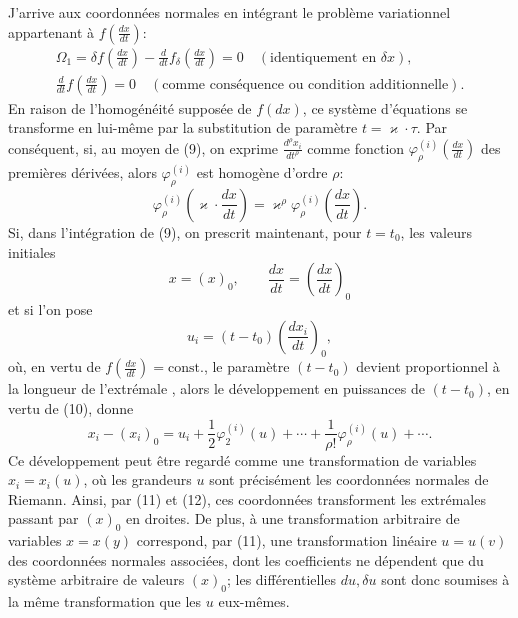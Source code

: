 J'arrive aux coordonnées normales en intégrant le problème variationnel
appartenant à \(f\!\left(\frac{dx}{dt}\right)\):
\begin{equation}
\begin{gathered}
\Omega_1=\delta f\!\left(\frac{dx}{dt}\right)
-\frac{d}{dt}f_\delta\!\left(\frac{dx}{dt}\right)=0
\quad(\text{identiquement en }\delta x),\\
\frac{d}{dt}f\!\left(\frac{dx}{dt}\right)=0
\quad(\text{comme conséquence ou condition additionnelle}).
\end{gathered}
\tag{9}
\end{equation}
En raison de l'homogénéité supposée de \(f(dx)\), ce système d'équations
se transforme en lui-même par la substitution de paramètre
\(t=\varkappa\cdot\tau\). Par conséquent, si, au moyen de (9), on exprime
\(\frac{d^\rho x_i}{dt^\rho}\) comme fonction
\(\varphi_\rho^{(i)}\!\left(\frac{dx}{dt}\right)\) des premières dérivées,
alors \(\varphi_\rho^{(i)}\) est homogène d'ordre \(\rho\):
\begin{equation}
\varphi_\rho^{(i)}\!\left(\varkappa\cdot\frac{dx}{dt}\right)
=\varkappa^\rho\varphi_\rho^{(i)}\!\left(\frac{dx}{dt}\right).
\tag{10}
\end{equation}
Si, dans l'intégration de (9), on prescrit maintenant, pour \(t=t_0\),
les valeurs initiales
\[
x=(x)_0,\qquad \frac{dx}{dt}=\left(\frac{dx}{dt}\right)_0
\]
et si l'on pose
\begin{equation}
u_i=(t-t_0)\left(\frac{dx_i}{dt}\right)_0,
\tag{11}
\end{equation}
où, en vertu de \(f\!\left(\frac{dx}{dt}\right)=\mathrm{const.}\), le
paramètre \((t-t_0)\) devient proportionnel à la \og{} longueur de l'extrémale \fg{},
alors le développement en puissances de \((t-t_0)\), en vertu de (10),
donne
\begin{equation}
x_i-(x_i)_0=u_i+\frac12\varphi_2^{(i)}(u)+\cdots+
\frac{1}{\rho!}\varphi_\rho^{(i)}(u)+\cdots .
\tag{12}
\end{equation}
Ce développement peut être regardé comme une transformation de variables
\(x_i=x_i(u)\), où les grandeurs \(u\) sont précisément les coordonnées
normales de Riemann. Ainsi, par (11) et (12), ces coordonnées transforment
les extrémales passant par \((x)_0\) en droites. De plus, à une transformation
arbitraire de variables \(x=x(y)\) correspond, par (11), une transformation
linéaire \(u=u(v)\) des coordonnées normales associées, dont les coefficients
ne dépendent que du système arbitraire de valeurs \((x)_0\); les différentielles
\(du,\delta u\) sont donc soumises à la même transformation que les \(u\)
eux-mêmes.

